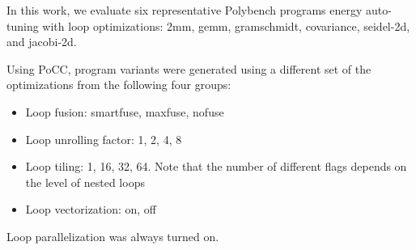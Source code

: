 In this work, we evaluate six representative Polybench programs energy auto-tuning with
loop optimizations: 2mm, gemm, gramschmidt, covariance, seidel-2d, and jacobi-2d.

Using PoCC, program variants were generated using
a different set of the 
optimizations from the following four groups: 
\begin{itemize}
    \item Loop fusion: smartfuse, maxfuse, nofuse
    \item Loop unrolling factor: 1, 2, 4, 8
    \item Loop tiling: 1, 16, 32, 64. Note that the number of different flags
 depends on the level of nested loops   
    \item Loop vectorization: on, off
\end{itemize}
Loop parallelization was always turned on.
